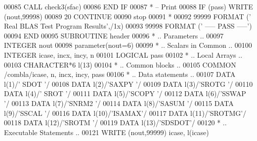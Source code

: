 \begin{DoxyCode}
00085             \textcolor{keyword}{CALL }check3(sfac)
00086 \textcolor{keywordflow}{         END IF}
00087 \textcolor{comment}{*        -- Print}
00088          \textcolor{keywordflow}{IF} (pass) \textcolor{keyword}{WRITE} (nout,99998)
00089    20 \textcolor{keywordflow}{CONTINUE}
00090       stop
00091 \textcolor{comment}{*}
00092 99999 \textcolor{keyword}{FORMAT} (\textcolor{stringliteral}{' Real BLAS Test Program Results'},/1x)
00093 99998 \textcolor{keyword}{FORMAT} (\textcolor{stringliteral}{'                                    ----- PASS -----'})
00094 \textcolor{keyword}{      END}
00095 \textcolor{keyword}{      SUBROUTINE }header
00096 \textcolor{comment}{*     .. Parameters ..}
00097       \textcolor{keywordtype}{INTEGER}          nout
00098       parameter(nout=6)
00099 \textcolor{comment}{*     .. Scalars in Common ..}
00100       \textcolor{keywordtype}{INTEGER}          icase, incx, incy, n
00101       \textcolor{keywordtype}{LOGICAL}          pass
00102 \textcolor{comment}{*     .. Local Arrays ..}
00103       \textcolor{keywordtype}{CHARACTER*6}      l(13)
00104 \textcolor{comment}{*     .. Common blocks ..}
00105       \textcolor{keyword}{COMMON}           /combla/icase, n, incx, incy, pass
00106 \textcolor{comment}{*     .. Data statements ..}
00107       \textcolor{keyword}{DATA}             l(1)/\textcolor{stringliteral}{' SDOT '}/
00108       \textcolor{keyword}{DATA}             l(2)/\textcolor{stringliteral}{'SAXPY '}/
00109       \textcolor{keyword}{DATA}             l(3)/\textcolor{stringliteral}{'SROTG '}/
00110       \textcolor{keyword}{DATA}             l(4)/\textcolor{stringliteral}{' SROT '}/
00111       \textcolor{keyword}{DATA}             l(5)/\textcolor{stringliteral}{'SCOPY '}/
00112       \textcolor{keyword}{DATA}             l(6)/\textcolor{stringliteral}{'SSWAP '}/
00113       \textcolor{keyword}{DATA}             l(7)/\textcolor{stringliteral}{'SNRM2 '}/
00114       \textcolor{keyword}{DATA}             l(8)/\textcolor{stringliteral}{'SASUM '}/
00115       \textcolor{keyword}{DATA}             l(9)/\textcolor{stringliteral}{'SSCAL '}/
00116       \textcolor{keyword}{DATA}             l(10)/\textcolor{stringliteral}{'ISAMAX'}/
00117       \textcolor{keyword}{DATA}             l(11)/\textcolor{stringliteral}{'SROTMG'}/
00118       \textcolor{keyword}{DATA}             l(12)/\textcolor{stringliteral}{'SROTM '}/
00119       \textcolor{keyword}{DATA}             l(13)/\textcolor{stringliteral}{'SDSDOT'}/
00120 \textcolor{comment}{*     .. Executable Statements ..}
00121       \textcolor{keyword}{WRITE} (nout,99999) icase, l(icase)

\end{DoxyCode}

